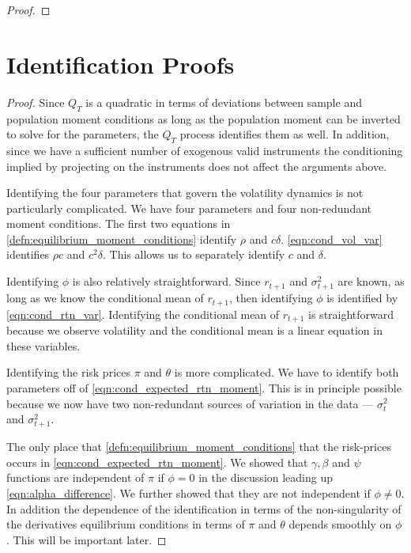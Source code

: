 \documentclass[11pt, letterpaper, twoside, final]{article}
\begin{document}
\begin{appendices}
\begin{proof}
\end{proof}


\section{Identification Proofs}


\identifiedSet*

\begin{proof}
  Since $Q_{T}$ is a quadratic in terms of deviations between sample and population moment conditions as long as
  the population moment can be inverted to solve for the parameters, the $Q_T$ process identifies them as well. 
  In addition, since we have a sufficient number of exogenous valid instruments the conditioning implied by
  projecting on the instruments does not affect the arguments above. 

  Identifying the four parameters that govern the volatility dynamics is not particularly complicated. 
  We have four parameters and four non-redundant moment conditions.
  The first two equations in  \cref{defn:equilibrium_moment_conditions} identify $\rho$ and $c \delta$.
  \cref{eqn:cond_vol_var} identifies $\rho c$ and $c^2 \delta$. 
  This allows us to separately identify $c$ and $\delta$.
  
  Identifying $\phi$ is also relatively straightforward. Since $r_{t+1}$ and $\sigma^2_{t+1}$ are known, as long
  as we know the conditional mean of $r_{t+1}$, then identifying $\phi$ is identified by \cref{eqn:cond_rtn_var}.
  Identifying the conditional mean of $r_{t+1}$ is straightforward because we observe volatility and the
  conditional mean is a linear equation in these variables. 
  

  Identifying the risk prices $\pi$ and $\theta$ is more complicated.
  We have to identify both parameters off of \cref{eqn:cond_expected_rtn_moment}. 
  This is in principle possible because we now have two non-redundant sources of variation in the data ---
  $\sigma^2_t$ and $\sigma^2_{t+1}$.

  The only place that \cref{defn:equilibrium_moment_conditions} that the risk-prices occurs in
  \cref{eqn:cond_expected_rtn_moment}. 
  We showed that $\gamma, \beta$ and $\psi$ functions are independent of $\pi$ if $\phi = 0$ in the discussion
  leading up \cref{eqn:alpha_difference}.
  We further showed that they are not independent if $\phi \neq 0$.
  In addition the dependence of the identification in terms of the non-singularity of the derivatives
  equilibrium conditions in terms of $\pi$ and $\theta$ depends smoothly on $\phi$. 
  This will be important later.
  
\end{proof}



\end{appendices}
\end{document}
